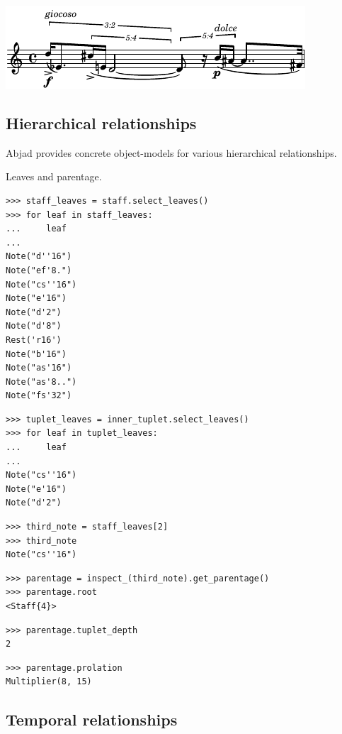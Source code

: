 \includegraphics[scale=1.0]{images/section_4_relationship_modeling-3.pdf}


\subsection{Hierarchical relationships}

Abjad provides concrete object-models for various hierarchical relationships.

Leaves and parentage.

\begin{lstlisting}
>>> staff_leaves = staff.select_leaves()
>>> for leaf in staff_leaves:
...     leaf
... 
Note("d''16")
Note("ef'8.")
Note("cs''16")
Note("e'16")
Note("d'2")
Note("d'8")
Rest('r16')
Note("b'16")
Note("as'16")
Note("as'8..")
Note("fs'32")
\end{lstlisting}


\begin{lstlisting}
>>> tuplet_leaves = inner_tuplet.select_leaves()
>>> for leaf in tuplet_leaves:
...     leaf
... 
Note("cs''16")
Note("e'16")
Note("d'2")
\end{lstlisting}


\begin{lstlisting}
>>> third_note = staff_leaves[2]
>>> third_note
Note("cs''16")
\end{lstlisting}



\begin{lstlisting}
>>> parentage = inspect_(third_note).get_parentage()
>>> parentage.root
<Staff{4}>
\end{lstlisting}


\begin{lstlisting}
>>> parentage.tuplet_depth
2
\end{lstlisting}


\begin{lstlisting}
>>> parentage.prolation
Multiplier(8, 15)
\end{lstlisting}


\subsection{Temporal relationships}

